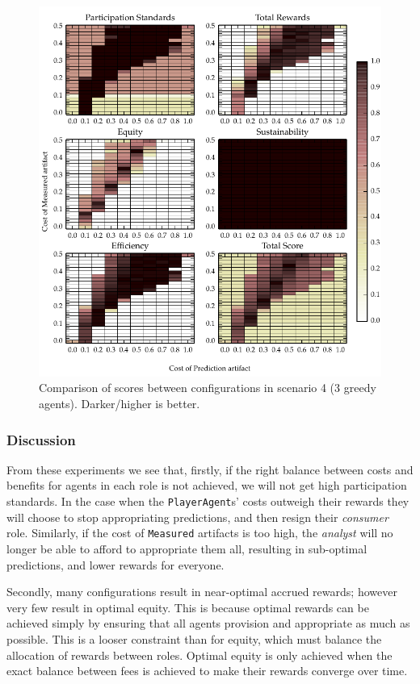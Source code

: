 \begin{figure}
\includegraphics{gfx/kc/static_1_3nc.pdf} 
\caption[Comparison of scores between configurations in scenario 4 (3 greedy agents).]{Comparison of scores between configurations in scenario 4 (3 greedy agents). Darker/higher is better.}\label{fig:static3nc}
\end{figure}

\subsubsection*{Discussion}

From these experiments we see that, firstly, if the right balance between
costs and benefits for agents in each role is not achieved, we will not get
high participation standards. In the case when the \texttt{PlayerAgent}s' costs
outweigh their rewards they will choose to stop appropriating predictions, and
then resign their \emph{consumer} role. Similarly, if the cost of
\texttt{Measured} artifacts is too high, the \emph{analyst} will no longer be
able to afford to appropriate them all, resulting in sub-optimal
predictions, and lower rewards for everyone.

Secondly, many configurations result in near-optimal accrued rewards; however very
few result in optimal equity. This is because optimal rewards can be achieved
simply by ensuring that all agents provision and appropriate as much as
possible. This is a looser constraint than for equity, which must balance the
allocation of rewards between roles. Optimal equity is only achieved when
the exact balance between fees is achieved to make their rewards converge
over time.

